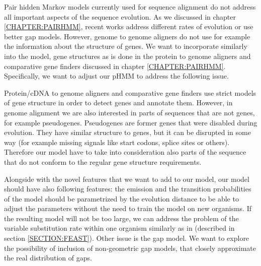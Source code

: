 Pair hidden Markov models currently used for sequence alignment do not address
all important aspects of the sequence evolution. As we discussed in chapter
\ref{CHAPTER:PAIRHMM}, recent works address different rates of evolution or use
better gap models. However, genome to genome aligners do not use for example the
information about the structure of genes. We want to incorporate similarly into
the model, gene structures as is done in the protein to genome aligners and
comparative gene finders discussed in chapter \ref{CHAPTER:PAIRHMM}.
Specifically, we want to adjust our pHMM to  address the following issue. 

Protein/cDNA to genome aligners and comparative gene
finders use strict models of  gene structure in order to detect genes and
annotate them.  However, in genome alignment we are also interested in parts of
sequences that are not genes, for example pseudogenes. Pseudogenes are former
genes that were disabled during evolution. They have similar structure to genes,
but it can be disrupted in some way (for example missing signals
like start codons, splice sites or others). Therefore our model have to take
into consideration also parts of the sequence that do not conform to the regular gene
structure requirements.

Alongside with the novel features that we want to add to our model, our model
should have also following features: the emission and the transition
probabilities of the model should be parametrized by the evolution distance to
be able to adjust the parameters without the need to train the model on new
organisms. If the resulting model will not be too large, we can address the
problem of the variable substitution rate within one organism similarly as in
\cite{Hudek2010} (described in section \ref{SECTION:FEAST}). Other issue is the
gap model. We want to explore the possibility of inclusion of non-geometric gap
models, that closely approximate the real distribution of gaps. 


